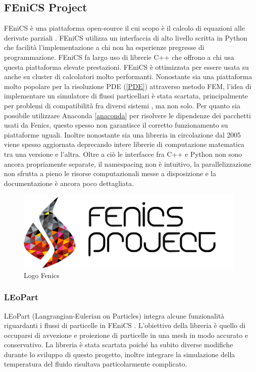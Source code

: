     \subsection{FEniCS Project}\label{fenics}
    FEniCS è una piattaforma open-source il cui scopo è il calcolo di equazioni alle derivate parziali \cite{LoggOlgaardEtAl2012a}.
    FEniCS utilizza un interfaccia di alto livello scritta in Python che facilità l'implementazione a chi non
    ha esperienze pregresse di programmazione. FEniCS fa largo uso di librerie C++ che offrono
    a chi usa questa piattaforma elevate prestazioni. FEniCS è ottimizzata per essere usata su anche su
    cluster di calcolatori molto performanti.
    Nonostante sia una piattaforma molto popolare per la risoluzione PDE (\ref{PDE}) attraverso metodo FEM, l'idea di
    implementare un simulatore di flussi particellari è stata scartata, principalmente per problemi di compatibilità fra diversi sistemi
    , ma non solo. Per quanto sia possibile utilizzare Anaconda \ref*{anaconda} per risolvere le dipendenze dei pacchetti usati da Fenics,
    questo spesso non garantisce il corretto funzionamento su piattaforme uguali. Inoltre nonostante sia una libreria in circolazione
    dal 2005 viene spesso aggiornata deprecando intere librerie di computazione matematica tra una versione e l'altra.
    Oltre a ciò le interfacce fra C++ e Python non sono ancora propriamente separate, il namespacing non è intuitivo,
    la parallelizzazione non sfrutta a pieno le risorse computazionali messe a disposizione e la documentazione è ancora poco dettagliata.
    \begin{figure}[H]
        \centering
        \includegraphics[width=\linewidth]{figure/fenics.png}
        \caption{Logo Fenics}
    \end{figure}

        \subsubsection{LEoPart}\label{leopart}
        LEoPart (Langrangian-Eulerian on Particles) integra alcune funzionalità riguardanti i flussi
        di particelle in FEniCS \cite{maljaars2020}. L'obiettivo della libreria è quello di occuparsi
        di avvezione e proiezione di particelle in una mesh in modo accurato e conservativo. La libreria è
        stata scartata poiché ha subito diverse modifiche durante lo sviluppo di questo progetto, inoltre
        integrare la simulazione della temperatura del fluido risultava particolarmente complicato.


